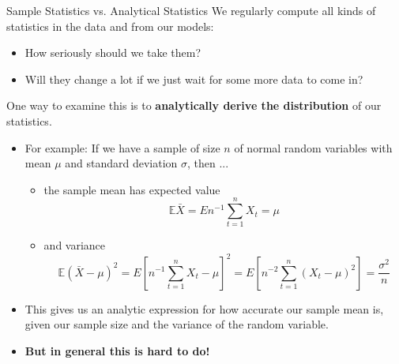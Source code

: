 \documentclass[10pt,c,aspectratio=1610,handout]{beamer}
\begin{document}
\begin{frame}{Sample Statistics vs. Analytical Statistics}%
  We regularly compute all kinds of statistics in the data and from our models:%
  \begin{itemize}%
    \item[$\blacktriangleright$] How seriously should we take them?%
    \item[$\blacktriangleright$] Will they change a lot if we just wait for some more data to come in?%
  \end{itemize}%
  \pause%
  One way to examine this is to \textbf{analytically derive the distribution} of our statistics.%
  \begin{itemize}%
    \item[$\blacktriangleright$] For example: If we have a sample of size $n$ of normal random variables with mean $\mu$ and standard deviation $\sigma$, then ...%
    \begin{small}%
      \begin{itemize}%
        \item[$\rightarrow$] the sample mean has expected value \[ \mathbb{E} \bar X = E n^{-1} \sum_{t=1}^{n} X_t = \mu \]%
        \item[$\rightarrow$] and variance \[ \mathbb{E} ( \bar X - \mu)^2 = E \left [ n^{-1} \sum_{t=1}^{n} X_t - \mu \right ]^2  = E \left [ n^{-2} \sum_{t=1}^{n} (X_t - \mu)^2  \right ] = \frac{\sigma^2}{n} \]%
      \end{itemize}%
    \end{small}%
    \pause%
    \item[$\blacktriangleright$] This gives us an analytic expression for how accurate our sample mean is, given our sample size and the variance of the random variable.%
    \item[$\blacktriangleright$] \textbf{But in general this is hard to do!}%
  \end{itemize}%
\end{frame}%
\end{document}
